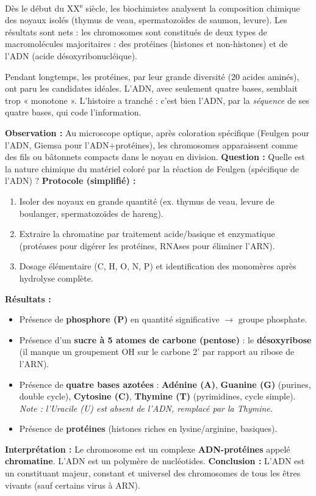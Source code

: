 \documentclass[11pt]{article}
\newcommand{\cle}[1]{{\popxbold\color{popdark}#1}}
\begin{document}
Dès le début du XX\textsuperscript{e} siècle, les biochimistes analysent la composition chimique des noyaux isolés (thymus de veau, spermatozoïdes de saumon, levure). Les résultats sont nets : les chromosomes sont constitués de deux types de macromolécules majoritaires : des \cle{protéines} (histones et non-histones) et de l'\cle{ADN} (acide désoxyribonucléique).

Pendant longtemps, les protéines, par leur grande diversité (20 acides aminés), ont paru les candidates idéales. L'ADN, avec seulement quatre bases, semblait trop « monotone ». L'histoire a tranché : c'est bien l'ADN, par la \emph{séquence} de ses quatre bases, qui code l'information.

\begin{experience}
\textbf{Observation :} Au microscope optique, après coloration spécifique (Feulgen pour l'ADN, Giemsa pour l'ADN+protéines), les chromosomes apparaissent comme des fils ou bâtonnets compacts dans le noyau en division.
\textbf{Question :} Quelle est la nature chimique du matériel coloré par la réaction de Feulgen (spécifique de l'ADN) ?
\textbf{Protocole (simplifié) :}
\begin{enumerate}
    \item Isoler des noyaux en grande quantité (ex. thymus de veau, levure de boulanger, spermatozoïdes de hareng).
    \item Extraire la chromatine par traitement acide/basique et enzymatique (protéases pour digérer les protéines, RNAses pour éliminer l'ARN).
    \item Dosage élémentaire (C, H, O, N, P) et identification des monomères après hydrolyse complète.
\end{enumerate}
\textbf{Résultats :}
\begin{itemize}
    \item Présence de \textbf{phosphore (P)} en quantité significative $\rightarrow$ groupe phosphate.
    \item Présence d'un \textbf{sucre à 5 atomes de carbone (pentose)} : le \textbf{désoxyribose} (il manque un groupement OH sur le carbone 2' par rapport au ribose de l'ARN).
    \item Présence de \textbf{quatre bases azotées} : \textbf{Adénine (A)}, \textbf{Guanine (G)} (purines, double cycle), \textbf{Cytosine (C)}, \textbf{Thymine (T)} (pyrimidines, cycle simple). \emph{Note : l'Uracile (U) est absent de l'ADN, remplacé par la Thymine.}
    \item Présence de \textbf{protéines} (histones riches en lysine/arginine, basiques).
\end{itemize}
\textbf{Interprétation :} Le chromosome est un complexe \textbf{ADN-protéines} appelé \textbf{chromatine}. L'ADN est un polymère de \cle{nucléotides}.
\textbf{Conclusion :} L'ADN est un constituant majeur, constant et universel des chromosomes de tous les êtres vivants (sauf certains virus à ARN).
\end{experience}
\end{document}
